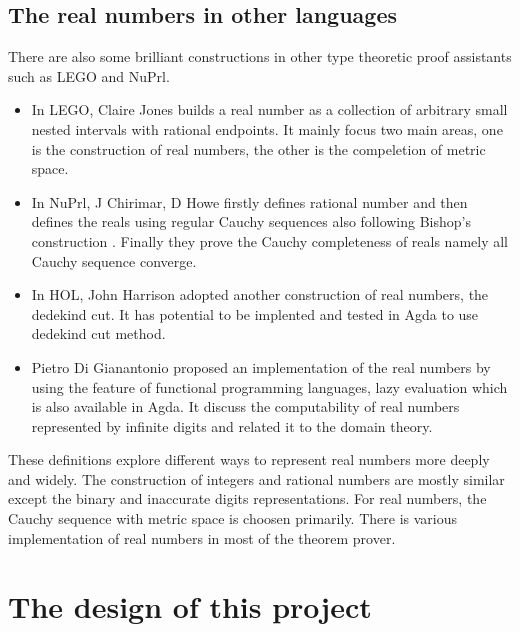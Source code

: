\documentclass{article}
\theoremstyle{definition}
\begin{document}
\subsection{The real numbers in other languages}
There are also some brilliant constructions in other type theoretic proof assistants such as LEGO and NuPrl. 
\begin{itemize}

\item In LEGO, Claire Jones \cite{jones} builds a real number as a collection of arbitrary small nested intervals with rational endpoints. It mainly focus two main areas, one is the construction of real numbers, the other is the compeletion of metric space. 

\item In NuPrl, J Chirimar, D Howe \cite{howe} firstly defines rational number and then defines the reals using regular Cauchy sequences also following Bishop's construction \cite{bishop}. Finally they prove the Cauchy completeness of reals namely all Cauchy sequence converge.

\item In HOL, John Harrison adopted another construction of real numbers, the dedekind cut. It has potential to be implented and tested in Agda to use dedekind cut method.

\item Pietro Di Gianantonio \cite{pdg} proposed an implementation of the real numbers by using the feature of functional programming languages, lazy evaluation which is also available in Agda. It discuss the computability of real numbers represented by infinite digits and related it to the domain theory.

\end{itemize}

These definitions explore different ways to represent real numbers more deeply and widely. The construction of integers and rational numbers are mostly similar except the binary and inaccurate digits representations. For real numbers, the Cauchy sequence with metric space is choosen primarily. There is various implementation of real numbers in most of the theorem prover.

\section{The design of this project}
\end{document}

